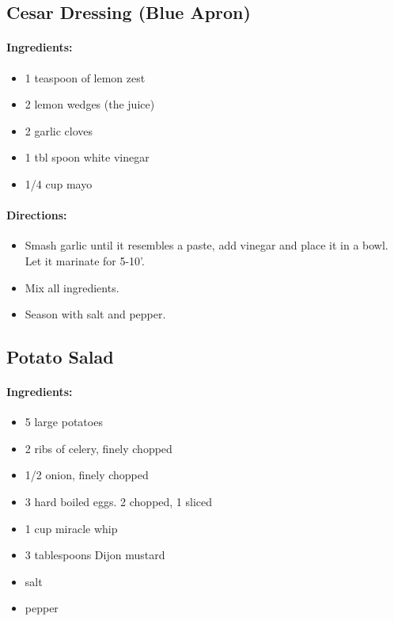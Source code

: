 \documentclass{article}
\begin{document}
\subsection{Cesar Dressing (Blue Apron)}

\paragraph{Ingredients:}

\begin{itemize}
	\item 1 teaspoon of lemon zest
	\item 2 lemon wedges (the juice)
	\item 2 garlic cloves
	\item 1 tbl spoon white vinegar
	\item 1/4 cup mayo
\end{itemize}

\paragraph{Directions:}
\begin{itemize}
	\item Smash garlic until it resembles a paste, add vinegar and place it in a bowl. Let it marinate for 5-10'. 
	\item Mix all ingredients.
	\item Season with salt and pepper.
\end{itemize}

\subsection{Potato Salad}

\paragraph{Ingredients:}

\begin{itemize}
	\item 5 large potatoes 
	\item 2 ribs of celery, finely chopped 
	\item 1/2 onion, finely chopped 
	\item 3 hard boiled eggs. 2 chopped, 1 sliced 
	\item 1 cup miracle whip 
	\item 3 tablespoons Dijon mustard 
	\item salt 
	\item pepper
\end{itemize}
\end{document}
